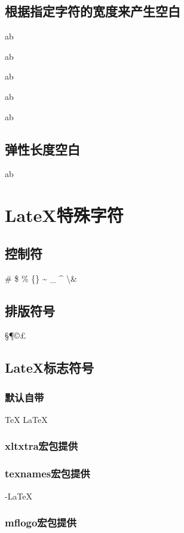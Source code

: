 \documentclass{article}
\begin{document}
	\subsection{根据指定字符的宽度来产生空白}
	a\hphantom{1}b\par
	a\hphantom{12}b\par
	a\hphantom{123}b\par
	a\hphantom{1234}b\par
	a\hphantom{12345}b\par
	
	\subsection{弹性长度空白}
	a\hfill b\par   %
	
	\section{LateX特殊字符}
	\subsection{控制符}
	\#   \$   \%   \{\}   \~{}   \_{}   \^{}   \textbackslash   \&
	
	\subsection{排版符号}
	\S  \P  \dag  \ddag  \copyright  \pounds
	
	\subsection{LateX标志符号}
	\subsubsection{默认自带}
	\TeX{}   \LaTeX{}   \LaTeXe{}
	\subsubsection{xltxtra宏包提供}
	\XeLaTeX
	\subsubsection{texnames宏包提供}
	\AmSTeX{}    \AmS-\LaTeX{}
	\BibTeX{}    \LuaTeX{}
	\subsubsection{mflogo宏包提供}
	\METAFONT{}    \MF{}    \MP{}
	
\end{document}
